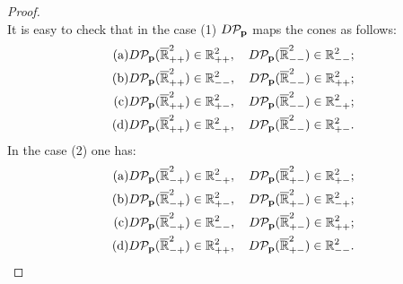 \begin{proof}
\begin{equation*}
	\end{equation*}
	It is easy to check that in the case (1) $D \mathcal{P}_{\vb{p}}$ maps the cones as follows:
	\begin{eqnarray*}
		(\textup{a}) & D \mathcal{P}_{\vb{p}} (\overline{\mathbb{R}}_{++}^2) \in \mathbb{R}_{++}^2, \quad D \mathcal{P}_{\vb{p}} (\overline{\mathbb{R}}_{--}^2) \in \mathbb{R}_{--}^2; \\
		(\textup{b}) & D \mathcal{P}_{\vb{p}} (\overline{\mathbb{R}}_{++}^2) \in \mathbb{R}_{--}^2, \quad D \mathcal{P}_{\vb{p}} (\overline{\mathbb{R}}_{--}^2) \in \mathbb{R}_{++}^2; \\
		(\textup{c}) & D \mathcal{P}_{\vb{p}} (\overline{\mathbb{R}}_{++}^2) \in \mathbb{R}_{+-}^2, \quad D \mathcal{P}_{\vb{p}} (\overline{\mathbb{R}}_{--}^2) \in \mathbb{R}_{-+}^2; \\
		(\textup{d}) & D \mathcal{P}_{\vb{p}} (\overline{\mathbb{R}}_{++}^2) \in \mathbb{R}_{-+}^2, \quad D \mathcal{P}_{\vb{p}} (\overline{\mathbb{R}}_{--}^2) \in \mathbb{R}_{+-}^2.
	\end{eqnarray*}
	In the case (2) one has:
	\begin{eqnarray*}
		(\textup{a}) & D \mathcal{P}_{\vb{p}} (\overline{\mathbb{R}}_{-+}^2) \in \mathbb{R}_{-+}^2, \quad D \mathcal{P}_{\vb{p}} (\overline{\mathbb{R}}_{+-}^2) \in \mathbb{R}_{+-}^2; \\
		(\textup{b}) & D \mathcal{P}_{\vb{p}} (\overline{\mathbb{R}}_{-+}^2) \in \mathbb{R}_{+-}^2, \quad D \mathcal{P}_{\vb{p}} (\overline{\mathbb{R}}_{+-}^2) \in \mathbb{R}_{-+}^2; \\
		(\textup{c}) & D \mathcal{P}_{\vb{p}} (\overline{\mathbb{R}}_{-+}^2) \in \mathbb{R}_{--}^2, \quad D \mathcal{P}_{\vb{p}} (\overline{\mathbb{R}}_{+-}^2) \in \mathbb{R}_{++}^2; \\
		(\textup{d}) & D \mathcal{P}_{\vb{p}} (\overline{\mathbb{R}}_{-+}^2) \in \mathbb{R}_{++}^2, \quad D \mathcal{P}_{\vb{p}} (\overline{\mathbb{R}}_{+-}^2) \in \mathbb{R}_{--}^2.
	\end{eqnarray*}
	

\end{proof}
